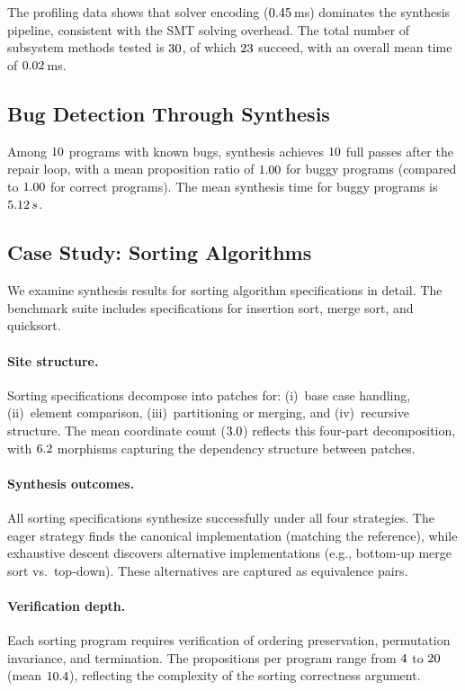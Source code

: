 \documentclass[11pt]{article}
\begin{document}
The profiling data shows that solver encoding
($0.45$\,ms) dominates the synthesis
pipeline, consistent with the SMT solving overhead.
The total number of subsystem methods tested is $30$,
of which $23$ succeed, with an overall mean
time of $0.02$\,ms.

\subsection{Bug Detection Through Synthesis}

Among $10$ programs with known bugs, synthesis
achieves $10$ full passes after the repair loop,
with a mean proposition ratio of $1.00$ for
buggy programs (compared to $1.00$ for
correct programs).  The mean synthesis time for buggy programs
is $5.12\,s$.

\subsection{Case Study: Sorting Algorithms}

We examine synthesis results for sorting algorithm specifications
in detail.  The benchmark suite includes specifications for
insertion sort, merge sort, and quicksort.

\paragraph{Site structure.}
Sorting specifications decompose into patches for:
(i)~base case handling, (ii)~element comparison,
(iii)~partitioning or merging, and (iv)~recursive structure.
The mean coordinate count ($3.0$) reflects this
four-part decomposition, with $6.2$ morphisms
capturing the dependency structure between patches.

\paragraph{Synthesis outcomes.}
All sorting specifications synthesize successfully under all four
strategies.  The eager strategy finds the canonical implementation
(matching the reference), while exhaustive descent discovers
alternative implementations (e.g., bottom-up merge sort vs.\
top-down).  These alternatives are captured as equivalence pairs.

\paragraph{Verification depth.}
Each sorting program requires verification of ordering preservation,
permutation invariance, and termination.  The propositions per
program range from $4$ to $20$ (mean
$10.4$), reflecting the complexity of the sorting
correctness argument.
\end{document}
